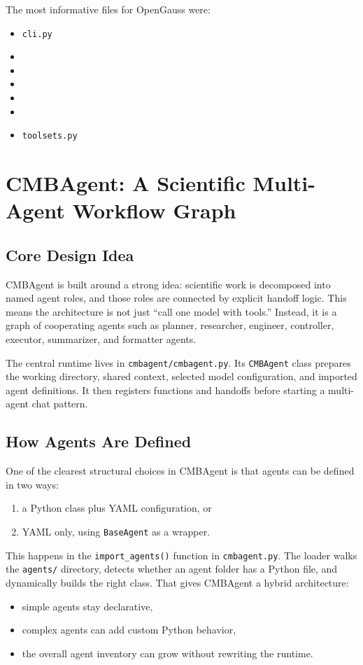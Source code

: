 \documentclass[11pt,a4paper]{article}
\begin{document}
The most informative files for OpenGauss were:
\begin{itemize}[leftmargin=1.5em]
\item \texttt{cli.py}
\item {}
\item {}
\item {}
\item {}
\item {}
\item \texttt{toolsets.py}
\end{itemize}

\section{CMBAgent: A Scientific Multi-Agent Workflow Graph}

\subsection{Core Design Idea}
CMBAgent is built around a strong idea: scientific work is decomposed into
named agent roles, and those roles are connected by explicit handoff logic.
This means the architecture is not just ``call one model with tools.'' Instead,
it is a graph of cooperating agents such as planner, researcher, engineer,
controller, executor, summarizer, and formatter agents.

The central runtime lives in \texttt{cmbagent/cmbagent.py}. Its
\texttt{CMBAgent} class prepares the working directory, shared context,
selected model configuration, and imported agent definitions. It then registers
functions and handoffs before starting a multi-agent chat pattern.

\subsection{How Agents Are Defined}
One of the clearest structural choices in CMBAgent is that agents can be
defined in two ways:
\begin{enumerate}[leftmargin=1.5em]
\item a Python class plus YAML configuration, or
\item YAML only, using \texttt{BaseAgent} as a wrapper.
\end{enumerate}

This happens in the \texttt{import\_agents()} function in
\texttt{cmbagent.py}. The loader walks the \texttt{agents/} directory, detects
whether an agent folder has a Python file, and dynamically builds the right
class. That gives CMBAgent a hybrid architecture:
\begin{itemize}[leftmargin=1.5em]
\item simple agents stay declarative,
\item complex agents can add custom Python behavior,
\item the overall agent inventory can grow without rewriting the runtime.
\end{itemize}
\end{document}
